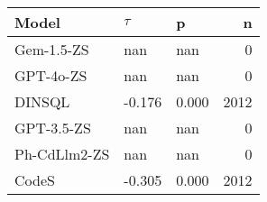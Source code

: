 \begin{tabular}{lllr}
\toprule
Model & $\tau$ & p & n \\
\midrule
Gem-1.5-ZS & nan & nan & 0 \\
GPT-4o-ZS & nan & nan & 0 \\
DINSQL & -0.176 & 0.000 & 2012 \\
GPT-3.5-ZS & nan & nan & 0 \\
Ph-CdLlm2-ZS & nan & nan & 0 \\
CodeS & -0.305 & 0.000 & 2012 \\
\bottomrule
\end{tabular}
